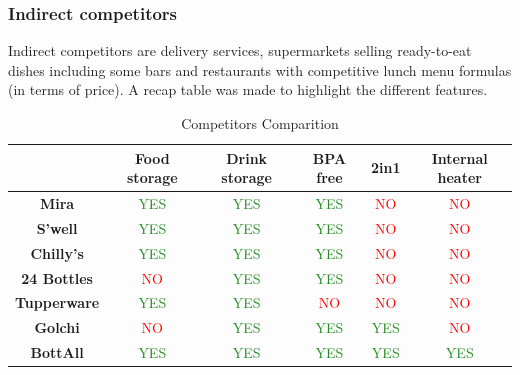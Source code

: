 \subsubsection{Indirect competitors}

Indirect competitors are delivery services, supermarkets selling ready-to-eat dishes including some bars and restaurants with competitive lunch menu formulas (in terms of price).
A recap table was made to highlight the different features.

\begin{table}[H]
\centering
\caption{Competitors Comparition}
\begin{tabular}{cccccc}
\toprule
 & \textbf{Food storage} & \textbf{Drink storage} & \textbf{BPA free} & \textbf{2in1} & \textbf{Internal heater}\\
\toprule
\textbf{Mira} & \textcolor{ForestGreen}{YES} & \textcolor{ForestGreen}{YES} & \textcolor{ForestGreen}{YES} & \textcolor{red}{NO} & \textcolor{red}{NO}\\
\hline
\textbf{S’well} & \textcolor{ForestGreen}{YES} & \textcolor{ForestGreen}{YES} & \textcolor{ForestGreen}{YES} & \textcolor{red}{NO} & \textcolor{red}{NO}\\
\hline
\textbf{Chilly’s} & \textcolor{ForestGreen}{YES} & \textcolor{ForestGreen}{YES} & \textcolor{ForestGreen}{YES} & \textcolor{red}{NO} & \textcolor{red}{NO}\\
\hline
\textbf{24 Bottles} & \textcolor{red}{NO} & \textcolor{ForestGreen}{YES} & \textcolor{ForestGreen}{YES} & \textcolor{red}{NO} & \textcolor{red}{NO}\\
\hline
\textbf{Tupperware} & \textcolor{ForestGreen}{YES} & \textcolor{ForestGreen}{YES} & \textcolor{red}{NO} & \textcolor{red}{NO} & \textcolor{red}{NO}\\
\hline
\textbf{Golchi} & \textcolor{red}{NO} & \textcolor{ForestGreen}{YES} & \textcolor{ForestGreen}{YES} & \textcolor{ForestGreen}{YES} & \textcolor{red}{NO}\\
\hline
\textbf{BottAll} & \textcolor{ForestGreen}{YES} & \textcolor{ForestGreen}{YES} & \textcolor{ForestGreen}{YES} & \textcolor{ForestGreen}{YES} & \textcolor{ForestGreen}{YES}\\

\bottomrule
\end{tabular}
\end{table}